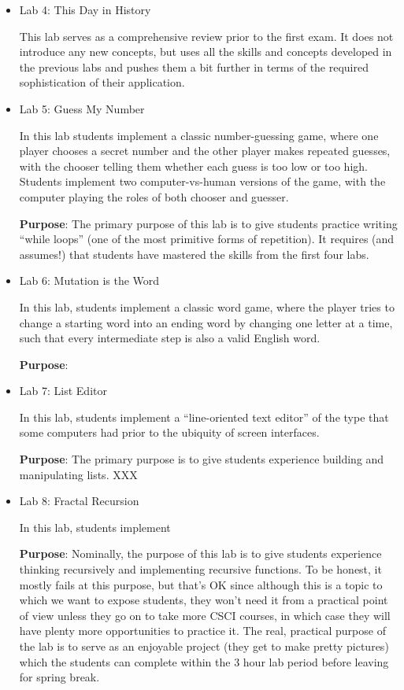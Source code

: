 \documentclass{article}
\begin{document}
\begin{itemize}
\item Lab 4: This Day in History

  This lab serves as a comprehensive review prior to the first exam.
  It does not introduce any new concepts, but uses all the skills and
  concepts developed in the previous labs and pushes them a bit
  further in terms of the required sophistication of their
  application.

\item Lab 5: Guess My Number

  In this lab students implement a classic number-guessing game, where
  one player chooses a secret number and the other player makes
  repeated guesses, with the chooser telling them whether each guess
  is too low or too high.  Students implement two computer-vs-human
  versions of the game, with the computer playing the roles of both
  chooser and guesser.

  \textbf{Purpose}: The primary purpose of this lab is to give
  students practice writing ``while loops'' (one of the most primitive
  forms of repetition).  It requires (and assumes!) that students have
  mastered the skills from the first four labs.

\item Lab 6: Mutation is the Word

  In this lab, students implement a classic word game, where the
  player tries to change a starting word into an ending word by
  changing one letter at a time, such that every intermediate step is
  also a valid English word.

  \textbf{Purpose}: 

\item Lab 7: List Editor

  In this lab, students implement a ``line-oriented text editor'' of
  the type that some computers had prior to the ubiquity of screen
  interfaces.

  \textbf{Purpose}: The primary purpose is to give students experience
  building and manipulating lists.  XXX

\item Lab 8: Fractal Recursion

  In this lab, students implement 

  \textbf{Purpose}: Nominally, the purpose of this lab is to give
  students experience thinking recursively and implementing recursive
  functions.  To be honest, it mostly fails at this purpose, but
  that's OK since although this is a topic to which we want to expose
  students, they won't need it from a practical point of view unless
  they go on to take more CSCI courses, in which case they will have
  plenty more opportunities to practice it.  The real, practical
  purpose of the lab is to serve as an enjoyable project (they get to
  make pretty pictures) which the students can complete within the 3
  hour lab period before leaving for spring break.


\end{itemize}
\end{document}

